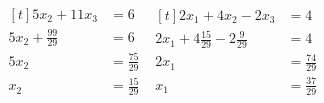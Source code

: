 \documentclass[letterpaper,fleqn,leqno]{article}
\begin{document}
{{\begin{enumerate}
				$\begin{aligned}[t]
					5x_2+11x_3 &= 6 \\
					5x_2+\frac{99}{29} &= 6 \\
					5x_2 &= \frac{75}{29} \\
					x_2 &= \frac{15}{29} \\
				\end{aligned}$ \quad
				$\begin{aligned}[t]
					2x_1+4x_2-2x_3 &= 4 \\
					2x_1+4\frac{15}{29}-2\frac{9}{29} &= 4 \\
					2x_1 &= \frac{74}{29} \\
					x_1 &= \frac{37}{29} \\
				\end{aligned}$
			\end{enumerate}
		}
	}
\end{document}
